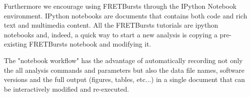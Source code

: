 Furthermore we encourage using FRETBursts through the IPython Notebook
environment. IPython notebooks are documents that contains both code and
rich text and multimedia content. All the FRETBursts tutorials are 
ipython notebooks and, indeed, a quick way to start a new analysis is copying 
a pre-existing FRETBursts notebook and modifying it.

The "notebook workflow"\cite{Shen_2014} has the advantage of automatically
recording not only the all analysis commands and parameters but also the
data file names, software versions and the full output 
(figures, tables, etc...) in a single document that can be interactively 
modified and re-executed.


